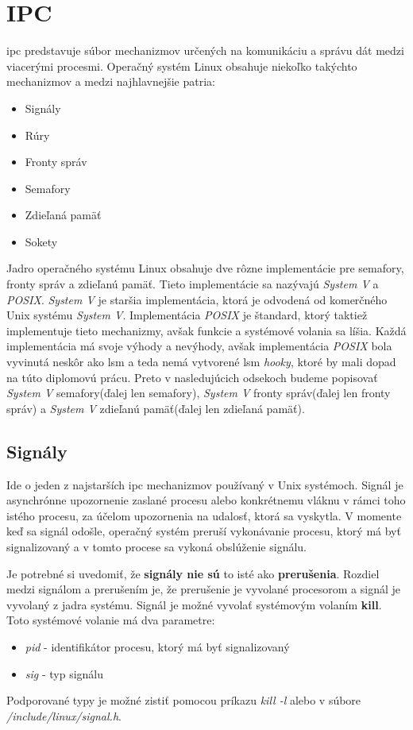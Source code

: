 \section{IPC} \label{ipc}
\acrfull{ipc} predstavuje súbor mechanizmov určených na komunikáciu a správu dát medzi viacerými procesmi. Operačný systém Linux obsahuje niekoľko takýchto mechanizmov a medzi najhlavnejšie patria:
\begin{itemize}
\item Signály
\item Rúry
\item Fronty správ
\item Semafory
\item Zdieľaná pamäť
\item Sokety
\end{itemize}
Jadro operačného systému Linux obsahuje dve rôzne implementácie pre semafory, fronty správ a zdieľanú pamäť. Tieto implementácie sa nazývajú \textit{System V} a \textit{POSIX}. \textit{System V} je staršia implementácia, ktorá je odvodená od komerčného Unix systému \textit{System V}. Implementácia \textit{POSIX} je štandard, ktorý taktiež implementuje tieto mechanizmy, avšak funkcie a systémové volania sa líšia. Každá implementácia má svoje výhody a nevýhody, avšak implementácia \textit{POSIX} bola vyvinutá neskôr ako \acrshort{lsm} a teda nemá vytvorené \acrshort{lsm} \textit{hooky}, ktoré by mali dopad na túto diplomovú prácu. Preto v nasledujúcich odsekoch budeme popisovať \textit{System V} semafory(ďalej len semafory), \textit{System V} fronty správ(ďalej len fronty správ) a \textit{System V} zdieľanú pamäť(ďalej len zdieľaná pamäť).
\subsection{Signály}
Ide o jeden z najstarších \acrshort{ipc} mechanizmov používaný v Unix systémoch. Signál je asynchrónne upozornenie zaslané procesu alebo konkrétnemu vláknu v rámci toho istého procesu, za účelom upozornenia na udalosť, ktorá sa vyskytla. V momente keď sa signál odošle, operačný systém preruší vykonávanie procesu, ktorý má byť signalizovaný a v tomto procese sa vykoná obslúženie signálu.\cite{signal}

Je potrebné si uvedomiť, že \textbf{signály nie sú} to isté ako \textbf{prerušenia}. Rozdiel medzi signálom a prerušením je, že prerušenie je vyvolané procesorom a signál je vyvolaný z jadra systému.
Signál je možné vyvolať systémovým volaním \textbf{kill}. Toto systémové volanie má dva parametre\cite{kill}:
\pagebreak
\begin{itemize}
\item \textit{pid} - identifikátor procesu, ktorý má byť signalizovaný
\item \textit{sig} - typ signálu
\end{itemize}
Podporované typy je možné zistiť pomocou príkazu \textit{kill -l} alebo v súbore \textit{/include/linux/signal.h}.


